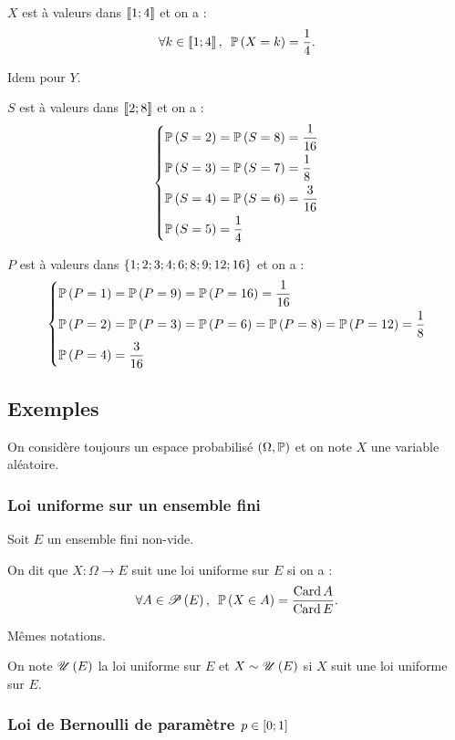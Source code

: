 \begin{corr}
\(X\) est à valeurs dans \(\left\llbracket1;4\right\rrbracket\) et on a : \[\quantifs{\forall k\in\interventierii{1}{4}}\proba{X=k}=\dfrac{1}{4}.\]

Idem pour \(Y\).

\(S\) est à valeurs dans \(\left\llbracket2;8\right\rrbracket\) et on a : \[\begin{dcases}
\mathbb{P}\left(S=2\right)=\mathbb{P}\left(S=8\right)=\dfrac{1}{16} \\
\mathbb{P}\left(S=3\right)=\mathbb{P}\left(S=7\right)=\dfrac{1}{8} \\
\mathbb{P}\left(S=4\right)=\mathbb{P}\left(S=6\right)=\dfrac{3}{16} \\
\mathbb{P}\left(S=5\right)=\dfrac{1}{4}
\end{dcases}\]

\(P\) est à valeurs dans \(\left\lbrace1;2;3;4;6;8;9;12;16\right\rbrace\) et on a : \[\begin{dcases}
\mathbb{P}\left(P=1\right)=\mathbb{P}\left(P=9\right)=\mathbb{P}\left(P=16\right)=\dfrac{1}{16} \\
\mathbb{P}\left(P=2\right)=\mathbb{P}\left(P=3\right)=\mathbb{P}\left(P=6\right)=\mathbb{P}\left(P=8\right)=\mathbb{P}\left(P=12\right)=\dfrac{1}{8} \\
\mathbb{P}\left(P=4\right)=\dfrac{3}{16}
\end{dcases}\]
\end{corr}

\subsection{Exemples}

On considère toujours un espace probabilisé \(\groupe{\Omega}[\prem]\) et on note \(X\) une variable aléatoire.

\subsubsection{Loi uniforme sur un ensemble fini}

\begin{defi}
Soit \(E\) un ensemble fini non-vide.

On dit que \(X:\Omega\to E\) suit une loi uniforme sur \(E\) si on a : \[\quantifs{\forall A\in\P{E}}\proba{X\in A}=\dfrac{\Card A}{\Card E}.\]
\end{defi}

\begin{nota}
Mêmes notations.

On note \(\mathscr{U}\left(E\right)\) la loi uniforme sur \(E\) et \(X\sim\mathscr{U}\left(E\right)\) si \(X\) suit une loi uniforme sur \(E\).
\end{nota}

\subsubsection{Loi de Bernoulli de paramètre \(p\in\left[0;1\right]\)}

